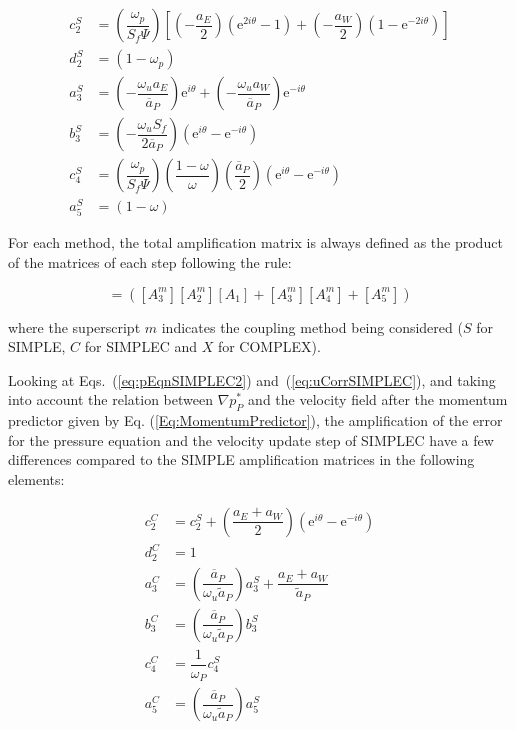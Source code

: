 \documentclass[final,3p,times,11pt,onecolumn]{myElsarticle}
\numberwithin{equation}{section}
\begin{document}
\begin{equation}
\begin{split}
     c^S_2 &= \left( \dfrac{\omega_p}{S_f \Psi} \right) 
                    \left[ \left(-\dfrac{a_E}{2} \right) \left(\text{e}^{2 i \theta} - 1 \right) +
                            \left(-\dfrac{a_W}{2} \right) \left(1 - \text{e}^{-2 i \theta}\right)
                    \right] \\
     d^S_2 &= (1-\omega_p) \\
     a^S_3 &= \left(-\dfrac{\omega_u a_E}{\overline{a}_P}\right) \text{e}^{i \theta} + \left(- \dfrac{\omega_u a_W}{\overline{a}_P}\right) \text{e}^{- i \theta} \\
     b^S_3 &= \left(-\dfrac{\omega_u S_f}{2 \overline{a}_P}\right) \left(\text{e}^{i \theta}-\text{e}^{-i \theta}\right) \\ 
     c^S_4 &= \left( \dfrac{\omega_p}{S_f \Psi} \right) 
                     \left(\dfrac{1-\omega}{\omega} \right) \left(\dfrac{\overline{a}_P}{2} \right) \left(\text{e}^{i \theta} - \text{e}^{- i \theta} \right)  \\
     a^S_5 &= (1-\omega)      
\end{split}
\end{equation}

For each method, the total amplification matrix is always defined as the product of the matrices of each step following the rule:

\begin{equation}
[A^m] = ([A^m_3] [A^m_2] [A_1] + [A^m_3] [A^m_4] + [A^m_5])
\end{equation}

\noindent where the superscript $m$ indicates the coupling method being considered ($S$ for SIMPLE, $C$ for SIMPLEC and $X$ for COMPLEX).

Looking at Eqs.~(\ref{eq:pEqnSIMPLEC2}) and~(\ref{eq:uCorrSIMPLEC}), and taking into account the relation between $\nabla p_P^*$ and the velocity field after the momentum predictor given by Eq. (\ref{Eq:MomentumPredictor}), the amplification of the error for the pressure equation and the velocity update step of SIMPLEC have a few differences compared to the SIMPLE amplification matrices in the following elements:

\begin{equation}
\begin{split}
     c^C_2 &= c_2^S + \left(\dfrac{a_E + a_W}{2}\right) (\text{e}^{i    \theta} - \text{e}^{-i \theta}) \\
     d^C_2 &= 1 \\
     a^C_3 &= \left(\dfrac{\overline{a}_P}{\omega_u \tilde{a}_P}\right) a_3^S + \dfrac{a_E+a_W}{\tilde{a}_P} \\
     b^C_3 &= \left(\dfrac{\overline{a}_P}{\omega_u \tilde{a}_P}\right) b_3^S \\ 
     c^C_4 &= \dfrac{1}{\omega_P} c^S_4 \\
     a^C_5 &= \left(\dfrac{\overline{a}_P}{\omega_u \tilde{a}_P}\right) a^S_5     
\end{split}
\end{equation}
\end{document}
